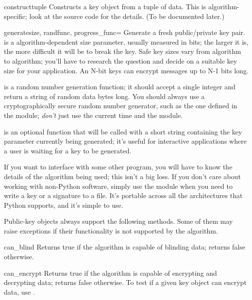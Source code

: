 \documentclass{howto}
\begin{document}
\begin{funcdesc}{construct}{tuple}
Constructs a key object from a tuple of data.  This is
algorithm-specific; look at the source code for the details.  (To be
documented later.)
\end{funcdesc}

\begin{funcdesc}{generate}{size, randfunc, progress_func=}
Generate a fresh public/private key pair.   is a
algorithm-dependent size parameter, usually measured in bits; the
larger it is, the more difficult it will be to break the key.  Safe
key sizes vary from algorithm to algorithm; you'll have to research
the question and decide on a suitable key size for your application.
An N-bit keys can encrypt messages up to N-1 bits long.

 is a random number generation function; it should
accept a single integer  and return a string of random data
 bytes long.  You should always use a cryptographically secure
random number generator, such as the one defined in the
 module; \emph{don't} just use the
current time and the  module. 

 is an optional function that will be called with a short
string containing the key parameter currently being generated; it's
useful for interactive applications where a user is waiting for a key
to be generated.
\end{funcdesc}

If you want to interface with some other program, you will have to know
the details of the algorithm being used; this isn't a big loss.  If you
don't care about working with non-Python software, simply use the
 module when you need to write a key or a signature to a
file.  It's portable across all the architectures that Python supports,
and it's simple to use.

Public-key objects always support the following methods.  Some of them
may raise exceptions if their functionality is not supported by the
algorithm.

\begin{methoddesc}{can_blind}{}
Returns true if the algorithm is capable of blinding data; 
returns false otherwise.  
\end{methoddesc}

\begin{methoddesc}{can_encrypt}{}
Returns true if the algorithm is capable of encrypting and decrypting
data; returns false otherwise.  To test if a given key object can encrypt
data, use .
\end{methoddesc}
\end{document}
